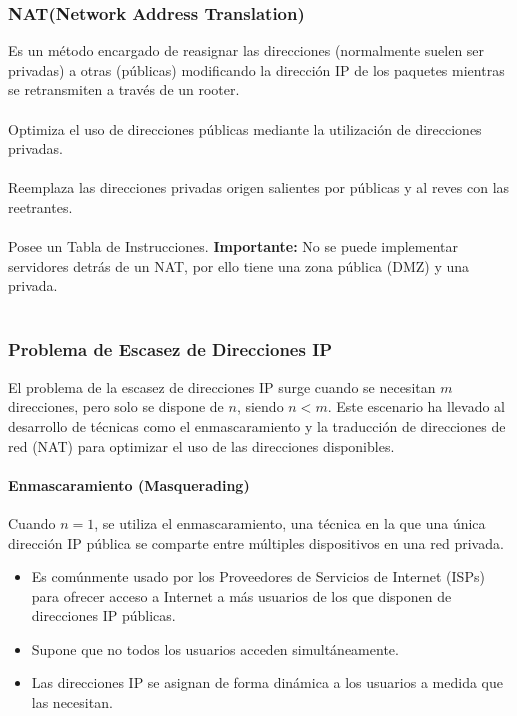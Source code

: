 \documentclass[a4paper,12pt]{article}
\begin{document}
\subsubsection{NAT(Network Address Translation)}

Es un método encargado de reasignar las direcciones (normalmente suelen ser privadas) a otras (públicas) modificando la dirección IP de los paquetes mientras se retransmiten a través de un rooter.\\\\
Optimiza el uso de direcciones públicas mediante la utilización de direcciones privadas.\\\\
Reemplaza las direcciones privadas origen salientes por públicas y al reves con las reetrantes.\\\\
Posee un Tabla de Instrucciones. \textbf{Importante:} No se puede implementar servidores detrás de un NAT, por ello tiene una zona pública (DMZ) y una privada.\\\\



\subsubsection{Problema de Escasez de Direcciones IP}

El problema de la escasez de direcciones IP surge cuando se necesitan \( m \) direcciones, pero solo se dispone de \( n \), siendo \( n < m \). Este escenario ha llevado al desarrollo de técnicas como el enmascaramiento y la traducción de direcciones de red (NAT) para optimizar el uso de las direcciones disponibles.

\paragraph{Enmascaramiento (Masquerading)}

Cuando \( n = 1 \), se utiliza el enmascaramiento, una técnica en la que una única dirección IP pública se comparte entre múltiples dispositivos en una red privada. 
\begin{itemize}
    \item Es comúnmente usado por los Proveedores de Servicios de Internet (ISPs) para ofrecer acceso a Internet a más usuarios de los que disponen de direcciones IP públicas.
    \item Supone que no todos los usuarios acceden simultáneamente.
    \item Las direcciones IP se asignan de forma dinámica a los usuarios a medida que las necesitan.
\end{itemize}
\end{document}
